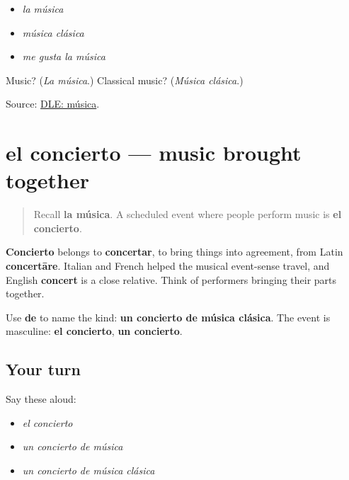 \begin{itemize}
\raggedright
  \item \emph{la música}
  \item \emph{música clásica}
  \item \emph{me gusta la música}
\end{itemize}

\begin{tcolorbox}[breakable,colback=teal!4,colframe=teal!35!black,title={Before you move on}]
Music? (\emph{La música}.) Classical music? (\emph{Música clásica}.)

Source: \href{https://dle.rae.es/m\%C3\%BAsica}{DLE: música}.
\end{tcolorbox}
\section[el concierto]{el concierto — music brought together}

\label{lesson:ES-C413-concierto}



\begin{quote}
Recall \textbf{la música}. A scheduled event where people perform music is \textbf{el concierto}.
\end{quote}

\begin{cousinweb}
\textbf{Concierto} belongs to \textbf{concertar}, to bring things into agreement, from Latin \textbf{concertāre}. Italian and French helped the musical event-sense travel, and English \textbf{concert} is a close relative. Think of performers bringing their parts together.
\end{cousinweb}

\begin{grammarlens}[title={Grammar Lens: concert of what?}]
Use \textbf{de} to name the kind: \textbf{un concierto de música clásica}. The event is masculine: \textbf{el concierto}, \textbf{un concierto}.
\end{grammarlens}

\subsection*{Your turn}
Say these aloud:

\begin{itemize}
\raggedright
  \item \emph{el concierto}
  \item \emph{un concierto de música}
  \item \emph{un concierto de música clásica}
\end{itemize}

